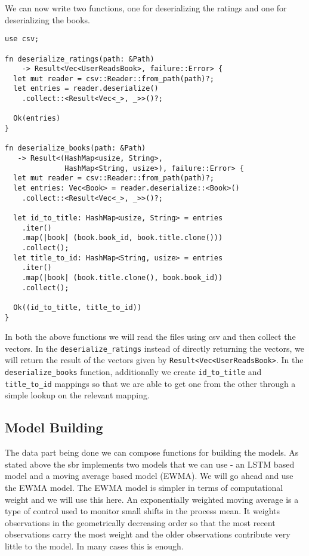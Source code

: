 \documentclass{book}
\begin{document}
We can now write two functions, one for deserializing the ratings and one for deserializing the books.

\begin{lstlisting}[caption={chapter7/goodbooks-recommender/src/main.rs}, basicstyle=\small]
use csv;

fn deserialize_ratings(path: &Path)
	-> Result<Vec<UserReadsBook>, failure::Error> {
  let mut reader = csv::Reader::from_path(path)?;
  let entries = reader.deserialize()
    .collect::<Result<Vec<_>, _>>()?;

  Ok(entries)
}

fn deserialize_books(path: &Path)
   -> Result<(HashMap<usize, String>,
              HashMap<String, usize>), failure::Error> {
  let mut reader = csv::Reader::from_path(path)?;
  let entries: Vec<Book> = reader.deserialize::<Book>()
    .collect::<Result<Vec<_>, _>>()?;

  let id_to_title: HashMap<usize, String> = entries
    .iter()
    .map(|book| (book.book_id, book.title.clone()))
    .collect();
  let title_to_id: HashMap<String, usize> = entries
    .iter()
    .map(|book| (book.title.clone(), book.book_id))
    .collect();

  Ok((id_to_title, title_to_id))
}
\end{lstlisting}

In both the above functions we will read the files using csv and then collect the vectors. In the \lstinline{deserialize_ratings} instead of directly returning the vectors, we will return the result of the vectors given by \lstinline{Result<Vec<UserReadsBook>}. In the \lstinline{deserialize_books} function, additionally we create \lstinline{id_to_title} and \lstinline{title_to_id} mappings so that we are able to get one from the other through a simple lookup on the relevant mapping.
\label{sub:Data}

\subsection{Model Building}%
The data part being done we can compose functions for building the models. As stated above the sbr implements two models that we can use - an LSTM based model and a moving average based model (EWMA). We will go ahead and use the EWMA model. The EWMA model is simpler in terms of computational weight and we will use this here. An exponentially weighted moving average is a type of control used to monitor small shifts in the process mean. It weights observations in the geometrically decreasing order so that the most recent observations carry the most weight and the older observations contribute very little to the model. In many cases this is enough.
\end{document}
